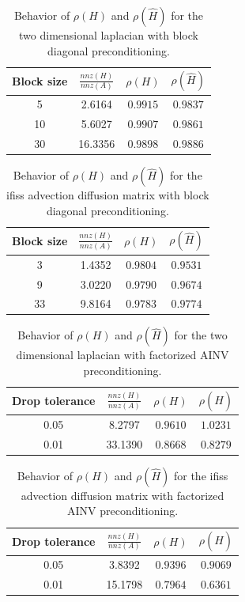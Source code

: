 \documentclass[a4paper,10pt]{article}
\begin{document}
\begin{table}[!h]
\centering
\begin{tabular}{|c|c|c|c|}
\hline
\textbf{Block size} & \textbf{$\frac{nnz(H)}{nnz(A)}$}& $\rho(H)$
&$\rho(\hat{H})$\\
\hline
 5 & 2.6164 & $0.9915$ & $0.9837$\\
\hline
 10 & 5.6027 & $0.9907$ & $0.9861$\\
\hline
 30 & 16.3356 & $0.9898$  & $0.9886$\\
\hline
\end{tabular}
\caption{Behavior of $\rho(H)$ and $\rho(\hat{H})$ for the two dimensional
laplacian with block diagonal preconditioning.}
\label{tab:lap2d_block}
\end{table}


\begin{table}[!h]
\centering
\begin{tabular}{|c|c|c|c|}
\hline
\textbf{Block size} & \textbf{$\frac{nnz(H)}{nnz(A)}$}& $\rho(H)$
&$\rho(\hat{H})$\\
\hline
 3 & 1.4352 & $0.9804$ & $0.9531$\\
\hline
 9 & 3.0220 & $0.9790$ & $0.9674$\\
\hline
 33 & 9.8164 & $0.9783$  & $0.9774$\\
\hline
\end{tabular}
\caption{Behavior of $\rho(H)$ and $\rho(\hat{H})$ for the ifiss advection
diffusion matrix with block diagonal preconditioning.}
\label{tab:ifiss_block}
\end{table}


\begin{table}[!h]
\centering
\begin{tabular}{|c|c|c|c|}
\hline
\textbf{Drop tolerance} & \textbf{$\frac{nnz(H)}{nnz(A)}$}& $\rho(H)$
&$\rho(\hat{H})$\\
\hline
 0.05 & 8.2797 & $0.9610$ & $1.0231$\\
\hline
 0.01 & 33.1390 & $0.8668$ & $0.8279$\\
\hline
\end{tabular}
\caption{Behavior of $\rho(H)$ and $\rho(\hat{H})$ for the two dimensional
laplacian with factorized AINV preconditioning.}
\label{tab:lap2d_ainv}
\end{table}

\begin{table}[!h]
\centering
\begin{tabular}{|c|c|c|c|}
\hline
\textbf{Drop tolerance} & \textbf{$\frac{nnz(H)}{nnz(A)}$}& $\rho(H)$
&$\rho(\hat{H})$\\
\hline
 0.05 & 3.8392 & $0.9396$ & $0.9069$\\
\hline
 0.01 & 15.1798 & $0.7964$ & $0.6361$\\
\hline
\end{tabular}
\caption{Behavior of $\rho(H)$ and $\rho(\hat{H})$ for the ifiss advection
diffusion matrix with factorized AINV preconditioning.}
\label{tab:ifiss_ainv}
\end{table}
\end{document}
